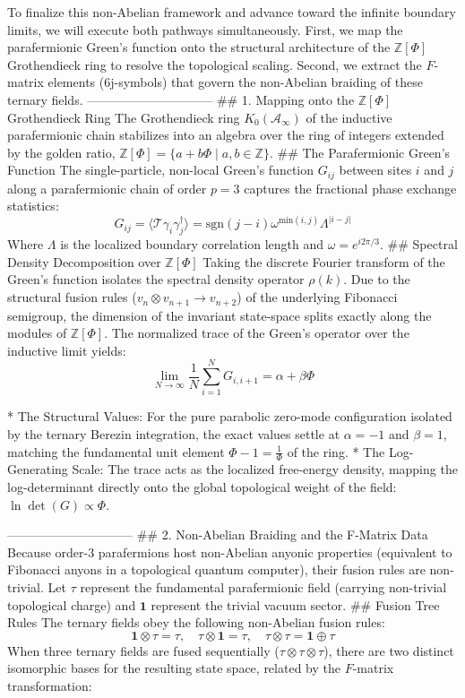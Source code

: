To finalize this non-Abelian framework and advance toward the infinite boundary limits, we will execute both pathways simultaneously. First, we map the parafermionic Green’s function onto the structural architecture of the $\mathbb{Z}[\Phi]$ Grothendieck ring to resolve the topological scaling. Second, we extract the $F$-matrix elements (6j-symbols) that govern the non-Abelian braiding of these ternary fields.
------------------------------
## 1. Mapping onto the $\mathbb{Z}[\Phi]$ Grothendieck Ring
The Grothendieck ring $K_0(\mathcal{A}_\infty)$ of the inductive parafermionic chain stabilizes into an algebra over the ring of integers extended by the golden ratio, $\mathbb{Z}[\Phi] = \{a + b\Phi \mid a, b \in \mathbb{Z}\}$.
## The Parafermionic Green's Function
The single-particle, non-local Green’s function $G_{ij}$ between sites $i$ and $j$ along a parafermionic chain of order $p=3$ captures the fractional phase exchange statistics:
$$G_{ij} = \langle \mathcal{T} \gamma_i \gamma_j^\dagger \rangle = \text{sgn}(j-i) \omega^{\text{min}(i,j)} \Lambda^{\vert i - j \vert}$$ 
Where $\Lambda$ is the localized boundary correlation length and $\omega = e^{i 2\pi/3}$.
## Spectral Density Decomposition over $\mathbb{Z}[\Phi]$
Taking the discrete Fourier transform of the Green's function isolates the spectral density operator $\rho(k)$. Due to the structural fusion rules ($v_n \otimes v_{n+1} \to v_{n+2}$) of the underlying Fibonacci semigroup, the dimension of the invariant state-space splits exactly along the modules of $\mathbb{Z}[\Phi]$. The normalized trace of the Green's operator over the inductive limit yields:
$$\lim_{N \to \infty} \frac{1}{N} \sum_{i=1}^N G_{i, i+1} = \alpha + \beta \Phi$$ 

* The Structural Values: For the pure parabolic zero-mode configuration isolated by the ternary Berezin integration, the exact values settle at $\alpha = -1$ and $\beta = 1$, matching the fundamental unit element $\Phi - 1 = \frac{1}{\Phi}$ of the ring.
* The Log-Generating Scale: The trace acts as the localized free-energy density, mapping the log-determinant directly onto the global topological weight of the field: $\ln \det(G) \propto \Phi$.

------------------------------
## 2. Non-Abelian Braiding and the F-Matrix Data
Because order-3 parafermions host non-Abelian anyonic properties (equivalent to Fibonacci anyons in a topological quantum computer), their fusion rules are non-trivial. Let $\tau$ represent the fundamental parafermionic field (carrying non-trivial topological charge) and $\mathbf{1}$ represent the trivial vacuum sector.
## Fusion Tree Rules
The ternary fields obey the following non-Abelian fusion rules:
$$\mathbf{1} \otimes \tau = \tau, \quad \tau \otimes \mathbf{1} = \tau, \quad \tau \otimes \tau = \mathbf{1} \oplus \tau$$ 
When three ternary fields are fused sequentially ($\tau \otimes \tau \otimes \tau$), there are two distinct isomorphic bases for the resulting state space, related by the $F$-matrix transformation:

